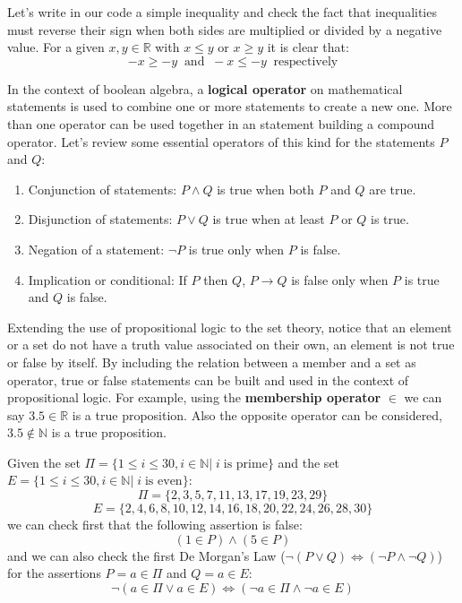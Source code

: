 Let's write in our code a simple inequality and check the fact that inequalities 
must reverse their sign when both sides are multiplied or divided by a negative value. 
For a given $x,y\in\mathbb{R}$ with $x\leq y$ or $x \geq y$ it is clear that:
$$
-x \geq -y \;\; \textrm{and} \;\; -x \leq -y \;\; \textrm{respectively}
$$

In the context of boolean algebra, a \textbf{logical operator} on mathematical statements is used to combine one or more statements to create a new one. 
More than one operator can be used together in an statement building a compound operator. 
Let's review some essential operators of this kind for the statements $P$ and $Q$:
\begin{enumerate}[noitemsep]
    \item Conjunction of statements: $P \land Q$ is true when both $P$ and $Q$ are true.
    \item Disjunction of statements: $P\lor Q$ is true when at least $P$ or $Q$ is true.
    \item Negation of a statement: $\neg P$ is true only when $P$ is false.
    \item Implication or conditional: If $P$ then $Q$, $P\to Q$ is false only when $P$ is true and $Q$ is false. 
\end{enumerate}

Extending the use of propositional logic to the set theory, notice that an element or a set 
do not have a truth value associated on their own, an element is not true or false by itself. 
By including the relation between a member and a set as operator, true or false statements can be 
built and used in the context of propositional logic. 
For example, using the \textbf{membership operator} $\in$ we can say $3.5 \in \mathbb{R}$ is a true proposition. 
Also the opposite operator can be considered, $3.5 \notin \mathbb{N}$ is a true proposition.

Given the set 
$\Pi = \{1\leq i\leq 30, i\in\mathbb{N}|\; i \;\textrm{is prime}\}$ 
and the set 
$E = \{1\leq i\leq 30, i\in\mathbb{N}|\; i \; \textrm{is even}\}$: 
$$
\Pi = \{2, 3, 5, 7, 11, 13, 17, 19, 23, 29\}
$$
$$
E = \{2, 4, 6, 8, 10, 12, 14, 16, 18, 20, 22, 24, 26, 28, 30\}
$$
we can check first that the following assertion is false:
$$
(1\in P) \land (5\in P)
$$
and we can also check the first De Morgan's Law ($\neg (P\lor Q) \iff (\neg P \land \neg Q)$) for the assertions $P = a\in \Pi$ and $Q = a\in E$:
$$
\neg (a\in\Pi \lor a\in E) \iff (\neg a\in\Pi \land \neg a\in E)
$$


